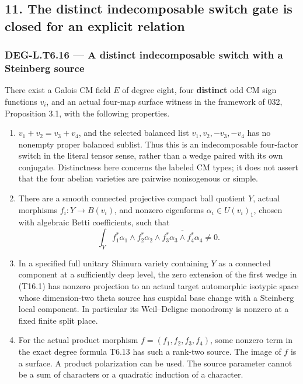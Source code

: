\documentclass[11pt,a4paper]{article}
\providecommand{\tightlist}{\setlength{\itemsep}{0pt}\setlength{\parskip}{0pt}}
\theoremstyle{definition}
\begin{document}
\subsection{11. The distinct indecomposable switch gate is closed for an explicit relation}\label{the-distinct-indecomposable-switch-gate-is-closed-for-an-explicit-relation}

\subsubsection{DEG-L.T6.16 --- A distinct indecomposable switch with a Steinberg source}\label{DEG-L.T6.16}

There exist a Galois CM field \(E\) of degree eight, four \textbf{distinct} odd CM sign functions \(v_i\), and an actual four-map surface witness in the framework of 032, Proposition 3.1, with the following properties.

\begin{enumerate}
\def\labelenumi{\arabic{enumi}.}
\tightlist
\item
  \(v_1+v_2=v_3+v_4\), and the selected balanced list \(v_1,v_2,-v_3,-v_4\) has no nonempty proper balanced sublist. Thus this is an indecomposable four-factor switch in the literal tensor sense, rather than a wedge paired with its own conjugate. Distinctness here concerns the labeled CM types; it does not assert that the four abelian varieties are pairwise nonisogenous or simple.
\item
  There are a smooth connected projective compact ball quotient \(Y\), actual morphisms \(f_i:Y\to B(v_i)\), and nonzero eigenforms \(\alpha_i\in U(v_i)_1\), chosen with algebraic Betti coefficients, such that \[
  \int_Y f_1^*\alpha_1\wedge f_2^*\alpha_2
         \wedge\overline{f_3^*\alpha_3\wedge f_4^*\alpha_4}\ne0.
  \tag{T16.1}
  \]
\item
  In a specified full unitary Shimura variety containing \(Y\) as a connected component at a sufficiently deep level, the zero extension of the first wedge in (T16.1) has nonzero projection to an actual target automorphic isotypic space whose dimension-two theta source has cuspidal base change with a Steinberg local component. In particular its Weil--Deligne monodromy is nonzero at a fixed finite split place.
\item
  For the actual product morphism \(f=(f_1,f_2,f_3,f_4)\), some nonzero term in the exact degree formula T6.13 has such a rank-two source. The image of \(f\) is a surface. A product polarization can be used. The source parameter cannot be a sum of characters or a quadratic induction of a character.
\end{enumerate}
\end{document}
